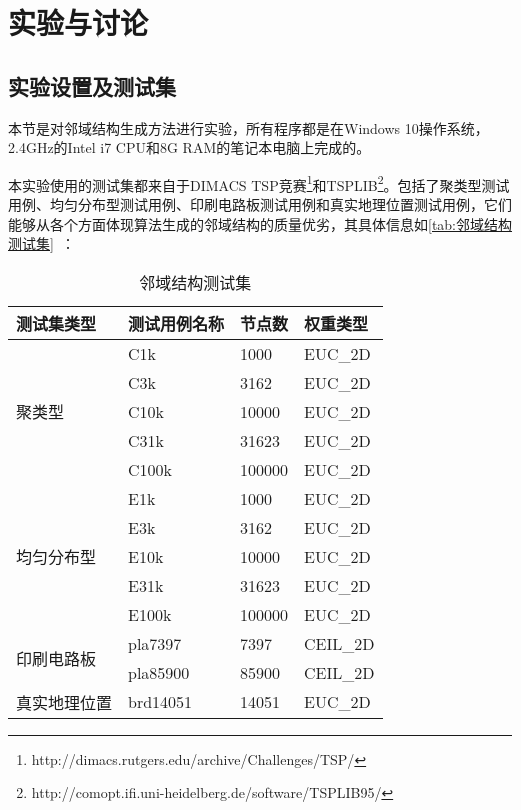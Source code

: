 \section{实验与讨论}
\label{sec:NS_Method:实验与讨论}

\subsection{实验设置及测试集}
\label{subsec:NS_Method:实验与讨论:测试集}
本节是对邻域结构生成方法进行实验，所有程序都是在Windows 10操作系统，2.4GHz的Intel i7 CPU和8G RAM的笔记本电脑上完成的。
\par
本实验使用的测试集都来自于DIMACS TSP竞赛\footnote{http://dimacs.rutgers.edu/archive/Challenges/TSP/}和TSPLIB\footnote{http://comopt.ifi.uni-heidelberg.de/software/TSPLIB95/}。包括了聚类型测试用例、均匀分布型测试用例、印刷电路板测试用例和真实地理位置测试用例，它们能够从各个方面体现算法生成的邻域结构的质量优劣，其具体信息如\autoref{tab:邻域结构测试集}~：
\begin{table}[htb]
    \caption[邻域结构测试集]{邻域结构测试集\label{tab:邻域结构测试集}}
    \begin{tabular}{llll}
        \toprule
        测试集类型 & 测试用例名称 & 节点数   & 权重类型 \\
        \midrule
        \multirow{5}[2]{*}{聚类型} & C1k   & 1000  & EUC\_2D \\
              & C3k   & 3162  & EUC\_2D \\
              & C10k  & 10000 & EUC\_2D \\
              & C31k  & 31623 & EUC\_2D \\
              & C100k & 100000 & EUC\_2D \\
        \midrule
        \multirow{5}[2]{*}{均匀分布型} & E1k   & 1000  & EUC\_2D \\
              & E3k   & 3162  & EUC\_2D \\
              & E10k  & 10000 & EUC\_2D \\
              & E31k  & 31623 & EUC\_2D \\
              & E100k & 100000 & EUC\_2D \\
        \midrule
        \multirow{2}[2]{*}{印刷电路板} & pla7397 & 7397  & CEIL\_2D \\
              & pla85900 & 85900 & CEIL\_2D \\
        \midrule
        真实地理位置 & brd14051 & 14051 & EUC\_2D \\
        \bottomrule
    \end{tabular}%
\end{table}
